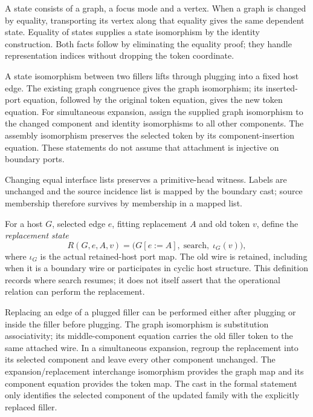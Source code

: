 A state consists of a graph, a focus mode and a vertex. When a graph is
changed by equality, transporting its vertex along that equality gives the
same dependent state. Equality of states supplies a state isomorphism by the
identity construction. Both facts follow by eliminating the equality proof;
they handle representation indices without dropping the token coordinate.



A state isomorphism between two fillers lifts through plugging into a fixed
host edge. The existing graph congruence gives the graph isomorphism; its
inserted-port equation, followed by the original token equation, gives the
new token equation. For simultaneous expansion, assign the supplied graph
isomorphism to the changed component and identity isomorphisms to all other
components. The assembly isomorphism preserves the selected token by its
component-insertion equation. These statements do not assume that attachment
is injective on boundary ports.



Changing equal interface lists preserves a primitive-head witness. Labels
are unchanged and the source incidence list is mapped by the boundary cast;
source membership therefore survives by membership in a mapped list.


For a host $G$, selected edge $e$, fitting replacement $A$ and old token $v$,
define the \emph{replacement state}
\[
 R(G,e,A,v)=\bigl(G[e:=A],\;\mathrm{search},\;\iota_G(v)\bigr),
\]
where $\iota_G$ is the actual retained-host port map. The old wire is retained,
including when it is a boundary wire or participates in cyclic host structure.
This definition records where search resumes; it does not itself assert that
the operational relation can perform the replacement.


Replacing an edge of a plugged filler can be performed either after
plugging or inside the filler before plugging. The graph isomorphism is
substitution associativity; its middle-component equation carries the old
filler token to the same attached wire. In a simultaneous expansion, regroup
the replacement into its selected component and leave every other component
unchanged. The expansion/replacement interchange isomorphism provides the
graph map and its component equation provides the token map. The cast in the
formal statement only identifies the selected component of the updated
family with the explicitly replaced filler.

